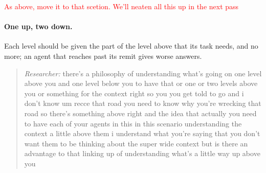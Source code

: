 
\textcolor{red}{As above, move it to that scetion. We'll neaten all this up in the next pass}
\label{sec:qual:practitioner:pt-one-up-two-down}\paragraph{One up, two down.}
Each level should be given the part of the level above that its task needs, and no more; an agent that reaches past its remit gives worse answers.

\begin{quote}\small
{\footnotesize\textit{Researcher:} there's a philosophy of understanding what's going on one level above you and one level below you to have that or one or two levels above you or something for the context right so you you get told to go and i don't know um recce that road you need to know why you're wrecking that road so there's something above right and the idea that actually you need to have each of your agents in this in this scenario understanding the context a little above them i understand what you're saying that you don't want them to be thinking about the super wide context but is there an advantage to that linking up of understanding what's a little way up above you}\par\smallskip

\end{quote}

